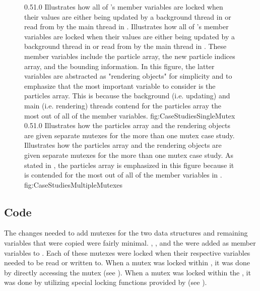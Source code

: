 \begin{figure}[t]
\addtocounter{figure}{-1}

	{0.5}{1.0}
	{Illustrates how all of 's member variables are locked when their values are either being updated by a background thread in  or read from by the main thread in .}
	{Illustrates how all of 's member variables are locked when their values are either being updated by a background thread in  or read from by the main thread in . These member variables include the particle array, the new particle indices array, and the bounding information. In this figure, the latter variables are abstracted as "rendering objects" for simplicity and to emphasize that the most important variable to consider is the particles array. This is because the background (i.e. updating) and main (i.e. rendering) threads contend for the particles array the most out of all of the member variables.}
	{fig:CaseStudiesSingleMutex}
	{0.5}{1.0}
	{Illustrates how the particles array and the rendering objects are given separate mutexes for the more than one mutex case study.}
	{Illustrates how the particles array and the rendering objects are given separate mutexes for the more than one mutex case study. As stated in , the particles array is emphasized in this figure because it is contended for the most out of all of the member variables in . }
	{fig:CaseStudiesMultipleMutexes}

\end{figure}

\subsection{Code}\label{ssec:studies_mutexes_code}

The changes needed to add mutexes for the two data structures and remaining variables that were copied were fairly minimal. , , and the  were added as member variables to . Each of these mutexes were locked when their respective variables needed to be read or written to. When a mutex was locked within , it was done by directly accessing the mutex (see ). When a mutex was locked within the , it was done by utilizing special locking functions\footnotemark $ $ provided by  (see ).

